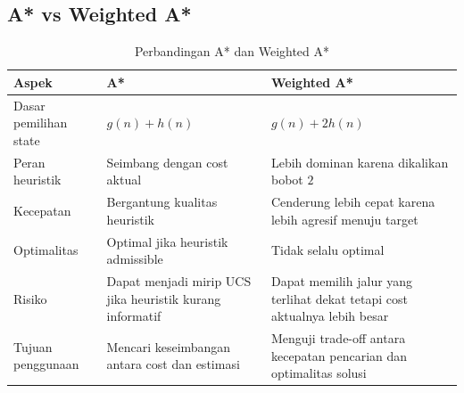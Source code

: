\subsection{A* vs Weighted A*}

\begin{table}[H]
	\centering
	\caption{Perbandingan A* dan Weighted A*}
	\begin{tabular}{|p{4cm}|p{5cm}|p{5cm}|}
		\hline
		\rowcolor{gray!25}
		\textbf{Aspek} & \textbf{A*} & \textbf{Weighted A*} \\
		\hline
		Dasar pemilihan state & $g(n)+h(n)$ & $g(n)+2h(n)$ \\
		\hline
		Peran heuristik & Seimbang dengan cost aktual & Lebih dominan karena dikalikan bobot $2$ \\
		\hline
		Kecepatan & Bergantung kualitas heuristik & Cenderung lebih cepat karena lebih agresif menuju target \\
		\hline
		Optimalitas & Optimal jika heuristik admissible & Tidak selalu optimal \\
		\hline
		Risiko & Dapat menjadi mirip UCS jika heuristik kurang informatif & Dapat memilih jalur yang terlihat dekat tetapi cost aktualnya lebih besar \\
		\hline
		Tujuan penggunaan & Mencari keseimbangan antara cost dan estimasi & Menguji trade-off antara kecepatan pencarian dan optimalitas solusi \\
		\hline
	\end{tabular}
\end{table}

